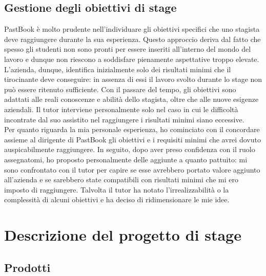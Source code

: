 		\subsection{Gestione degli obiettivi di stage}
			PastBook è molto prudente nell'individuare gli obiettivi specifici che uno stagista deve raggiungere durante la sua
			esperienza. Questo approccio deriva dal fatto che spesso gli studenti non sono pronti per essere inseriti all'interno del
			mondo del lavoro e dunque non riescono a soddisfare pienamente aspettative troppo elevate.\\
			L'azienda, dunque, identifica inizialmente solo dei risultati minimi che il tirocinante deve conseguire: in assenza di essi
			il lavoro svolto durante lo stage non può essere ritenuto sufficiente. Con il passare del tempo, gli obiettivi sono adattati
			alle reali conoscenze e abilità dello stagista, oltre che alle nuove esigenze aziendali. Il tutor interviene personalmente
			solo nel caso in cui le difficoltà incontrate dal suo assistito nel raggiungere i risultati minimi siano eccessive.\\
			Per quanto riguarda la mia personale esperienza, ho cominciato con il concordare assieme al dirigente di PastBook gli
			obiettivi e i requisiti minimi che avrei dovuto auspicabilmente raggiungere. In seguito, dopo aver preso confidenza con il
			ruolo assegnatomi, ho proposto personalmente delle aggiunte a quanto pattuito: mi sono confrontato con il tutor per capire
			se esse avrebbero portato valore aggiunto all'azienda e se sarebbero state compatibili con risultati minimi che mi ero
			imposto di raggiungere. Talvolta il tutor ha notato l'irrealizzabilità o la complessità di alcuni obiettivi e ha deciso di
			ridimensionare le mie idee.
	\section{Descrizione del progetto di stage}
		\subsection{Prodotti}
